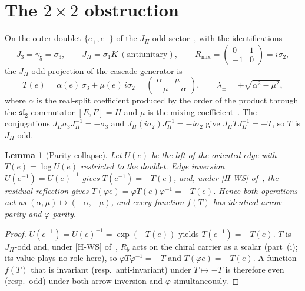 \documentclass[11pt]{article}
\theoremstyle{plain}
\newtheorem{lemma}{Lemma}
\theoremstyle{remark}
\newcommand{\JPi}{J_\Pi}
\newcommand{\Rmix}{R_{\mathrm{mix}}}
\begin{document}
  \section{The $2\times 2$ obstruction}

    On the outer doublet $\{e_+,e_-\}$ of the $\JPi$-odd sector~\cite[Prop.~6.3]{Beau2026q14}, with the identifications
    \begin{equation}
      J_3 = \gamma_5 = \sigma_3,\qquad
      \JPi = \sigma_1 K \ (\text{antiunitary}),\qquad
      \Rmix = \begin{pmatrix}0 & 1\\ -1 & 0\end{pmatrix} = i\sigma_2,
    \end{equation}
    the $\JPi$-odd projection of the cascade generator is
    \begin{equation}
      T(e) = \alpha(e)\,\sigma_3 + \mu(e)\,i\sigma_2
      = \begin{pmatrix}\alpha & \mu\\ -\mu & -\alpha\end{pmatrix},
      \qquad \lambda_\pm = \pm\sqrt{\alpha^2-\mu^2},
    \end{equation}
    where $\alpha$ is the real-split coefficient produced by the order of the product through the $\mathfrak{sl}_2$
    commutator $[E,F]=H$ and $\mu$ is the mixing coefficient~\cite[Prop.~6.5]{Beau2026q14}.
    The conjugations $\JPi\sigma_3\JPi^{-1} = -\sigma_3$ and $\JPi(i\sigma_2)\JPi^{-1} = -i\sigma_2$ give $\JPi T
  \JPi^{-1} = -T$, so $T$ is $\JPi$-odd.

    \begin{lemma}[Parity collapse]
Let $U(e)$ be the lift of the oriented edge with $T(e) = \log U(e)$ restricted to the doublet.
Edge inversion $U(e^{-1}) = U(e)^{-1}$ gives $T(e^{-1}) = -T(e)$, and, under [H-WS] of~\cite{Beau2026q11of}, the
residual reflection gives $T(\varphi e) = \varphi T(e)\varphi^{-1} = -T(e)$.
Hence both operations act as $(\alpha,\mu)\mapsto(-\alpha,-\mu)$, and every function $f(T)$ has identical
arrow-parity and $\varphi$-parity.
    \end{lemma}

    \begin{proof}
      $U(e^{-1}) = U(e)^{-1} = \exp(-T(e))$ yields $T(e^{-1}) = -T(e)$.
      $T$ is $\JPi$-odd and, under [H-WS] of~\cite{Beau2026q11of}, $R_b$ acts on the chiral carrier as a scalar (part~(i); its value plays no role here), so $\varphi T\varphi^{-1} = -T$ and
      $T(\varphi e) = -T(e)$.
      A function $f(T)$ that is invariant (resp.\ anti-invariant) under $T\mapsto -T$ is therefore even (resp.\ odd) under
      both arrow inversion and $\varphi$ simultaneously.
    \end{proof}
\end{document}
